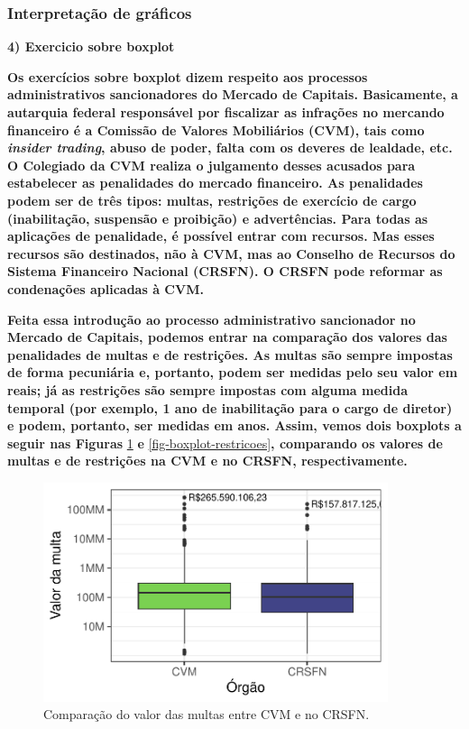 \documentclass[
  letterpaper,
  DIV=11,
  numbers=noendperiod]{scrartcl}
\begin{document}
\newpage{}

\hypertarget{interpretauxe7uxe3o-de-gruxe1ficos}{%
\subsubsection{Interpretação de
gráficos}\label{interpretauxe7uxe3o-de-gruxe1ficos}}

\textbf{4) Exercicio sobre boxplot}

\textbf{Os exercícios sobre boxplot dizem respeito aos processos
administrativos sancionadores do Mercado de Capitais. Basicamente, a
autarquia federal responsável por fiscalizar as infrações no mercando
financeiro é a Comissão de Valores Mobiliários (CVM), tais como
\emph{insider trading}, abuso de poder, falta com os deveres de
lealdade, etc. O Colegiado da CVM realiza o julgamento desses acusados
para estabelecer as penalidades do mercado financeiro. As penalidades
podem ser de três tipos: multas, restrições de exercício de cargo
(inabilitação, suspensão e proibição) e advertências. Para todas as
aplicações de penalidade, é possível entrar com recursos. Mas esses
recursos são destinados, não à CVM, mas ao Conselho de Recursos do
Sistema Financeiro Nacional (CRSFN). O CRSFN pode reformar as
condenações aplicadas à CVM.}

\textbf{Feita essa introdução ao processo administrativo sancionador no
Mercado de Capitais, podemos entrar na comparação dos valores das
penalidades de multas e de restrições. As multas são sempre impostas de
forma pecuniária e, portanto, podem ser medidas pelo seu valor em reais;
já as restrições são sempre impostas com alguma medida temporal (por
exemplo, 1 ano de inabilitação para o cargo de diretor) e podem,
portanto, ser medidas em anos. Assim, vemos dois boxplots a seguir nas
Figuras} \ref{fig-boxplot-multas} \textbf{e}
\ref{fig-boxplot-restricoes}\textbf{, comparando os valores de multas e
de restrições na CVM e no CRSFN, respectivamente.}

\begin{figure}

{\centering \includegraphics[width=0.9\textwidth,height=\textheight]{e_pgd_files/figure-pdf/fig-boxplot-multas-1.pdf}

}

\caption{\label{fig-boxplot-multas}Comparação do valor das multas entre
CVM e no CRSFN.}

\end{figure}
\end{document}
